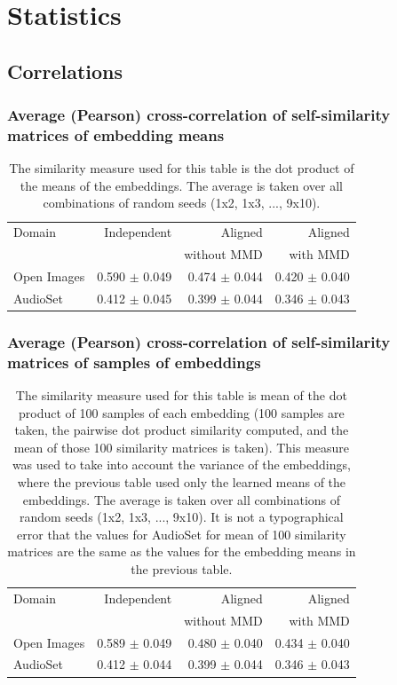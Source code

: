 \section{Statistics}

\subsection{Correlations}
\subsubsection{Average (Pearson) cross-correlation of self-similarity matrices of embedding means}

\begin{table}[H]
\centering
\begin{tabular}{lrrr}
\toprule
Domain &   Independent & Aligned     &  Aligned  \\
       &               & without MMD &  with MMD \\
\midrule
Open Images    & 0.590 $\pm$ 0.049 & 0.474 $\pm$ 0.044 &     0.420 $\pm$  0.040 \\
AudioSet    & 0.412 $\pm$ 0.045 &  0.399 $\pm$ 0.044  &      0.346  $\pm$ 0.043  \\
\bottomrule
\end{tabular}
\caption{The similarity measure used for this table is the dot product of the means of the embeddings. The average is taken over all combinations of random seeds (1x2, 1x3, ..., 9x10).}
\end{table}

\subsubsection{Average (Pearson) cross-correlation of self-similarity matrices of samples of embeddings}
\begin{table}[H]
\centering
\begin{tabular}{lrrr}
\toprule
Domain &   Independent & Aligned     &  Aligned  \\
       &               & without MMD &  with MMD \\
\midrule
Open Images    & 0.589 $\pm$ 0.049 & 0.480 $\pm$ 0.040 &     0.434 $\pm$  0.040 \\
AudioSet    & 0.412 $\pm$ 0.044 &  0.399 $\pm$ 0.044  &      0.346  $\pm$ 0.043  \\
\bottomrule
\end{tabular}
\caption{The similarity measure used for this table is mean of the dot product of 100 samples of each embedding (100 samples are taken, the pairwise dot product similarity computed, and the mean of those 100 similarity matrices is taken). This measure was used to take into account the variance of the embeddings, where the previous table used only the learned means of the embeddings. The average is taken over all combinations of random seeds (1x2, 1x3, ..., 9x10). It is not a typographical error that the values for AudioSet for mean of 100 similarity matrices are the same as the values for the embedding means in the previous table. }
\end{table}

